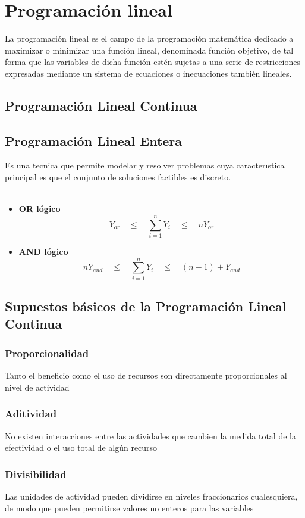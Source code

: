 \documentclass[12pt]{book}
\begin{document}
\section{Programación lineal}La programación lineal es el campo de la programación matemática dedicado a maximizar o minimizar una función lineal, denominada función objetivo, de tal forma que las variables de dicha función estén sujetas a una serie de restricciones expresadas mediante un sistema de ecuaciones o inecuaciones también lineales.
\subsection{Programación Lineal Continua}
\subsection{Programación Lineal Entera}Es una tecnica que permite modelar y resolver problemas cuya caracterıstica principal
es que el conjunto de soluciones factibles es discreto.
\\
\\

\begin{itemize}
\item \textbf{OR l\'ogico}
\[ Y_{or} \quad \leq \quad \sum_{i=1}^{n}Y_{i} \quad \leq \quad n Y_{or}\]
\item \textbf{AND l\'ogico}
\[ n Y_{and} \quad \leq \quad \sum_{i=1}^{n}Y_{i} \quad \leq \quad (n-1) + Y_{and} \]
\end{itemize}


\subsection{Supuestos básicos de la Programación Lineal Continua}
\subsubsection{Proporcionalidad}
Tanto el beneficio como el uso de recursos son directamente proporcionales al nivel de
actividad
\subsubsection{Aditividad}No existen interacciones entre las actividades que cambien la medida total de la
efectividad o el uso total de algún recurso
\subsubsection{Divisibilidad}Las unidades de actividad pueden dividirse en niveles fraccionarios cualesquiera, de
modo que pueden permitirse valores no enteros para las variables
\end{document}
